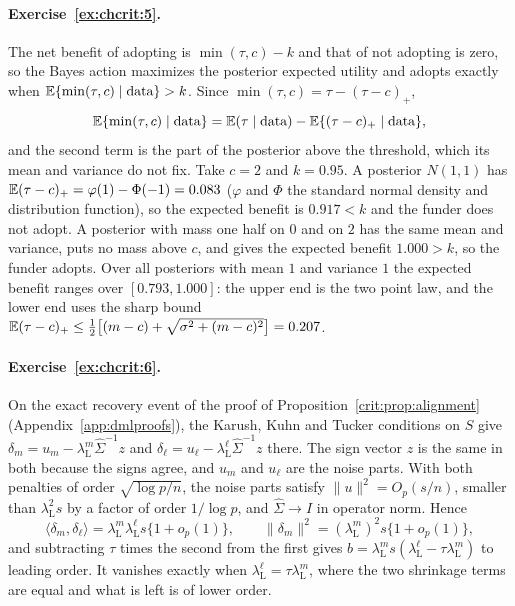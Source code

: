 \paragraph{Exercise~\ref{ex:chcrit:5}.} The net benefit of adopting is $\min(\tau, c) - k$ and that of not adopting is zero, so the Bayes action maximizes the posterior expected utility and adopts exactly when $\mathbb{E}\{\min(\tau, c) \mid \text{data}\} > k$. Since $\min(\tau, c) = \tau - (\tau - c)_+$,
\[
\mathbb{E}\{\min(\tau, c) \mid \text{data}\} = \mathbb{E}(\tau \mid \text{data}) - \mathbb{E}\{(\tau - c)_+ \mid \text{data}\},
\]
and the second term is the part of the posterior above the threshold, which its mean and variance do not fix. Take $c = 2$ and $k = 0.95$. A posterior $N(1, 1)$ has $\mathbb{E}(\tau - c)_+ = \varphi(1) - \Phi(-1) = 0.083$ ($\varphi$ and $\Phi$ the standard normal density and distribution function), so the expected benefit is $0.917 < k$ and the funder does not adopt. A posterior with mass one half on $0$ and on $2$ has the same mean and variance, puts no mass above $c$, and gives the expected benefit $1.000 > k$, so the funder adopts. Over all posteriors with mean $1$ and variance $1$ the expected benefit ranges over $[0.793, 1.000]$: the upper end is the two point law, and the lower end uses the sharp bound $\mathbb{E}(\tau - c)_+ \le \tfrac12\bigl[(m - c) + \sqrt{\sigma^2 + (m - c)^2}\bigr] = 0.207$.

\paragraph{Exercise~\ref{ex:chcrit:6}.} On the exact recovery event of the proof of Proposition~\ref{crit:prop:alignment} (Appendix~\ref{app:dmlproofs}), the Karush, Kuhn and Tucker conditions on $S$ give $\delta_m = u_m - \lambda_{\mathrm L}^m\hat\Sigma^{-1}z$ and $\delta_\ell = u_\ell - \lambda_{\mathrm L}^\ell\hat\Sigma^{-1}z$ there. The sign vector $z$ is the same in both because the signs agree, and $u_m$ and $u_\ell$ are the noise parts. With both penalties of order $\sqrt{\log p/n}$, the noise parts satisfy $\|u\|^2 = O_p(s/n)$, smaller than $\lambda_{\mathrm L}^2 s$ by a factor of order $1/\log p$, and $\hat\Sigma \to I$ in operator norm. Hence
\[
\langle\delta_m,\delta_\ell\rangle = \lambda_{\mathrm L}^m\lambda_{\mathrm L}^\ell s\{1 + o_p(1)\}, \qquad \|\delta_m\|^2 = (\lambda_{\mathrm L}^m)^2 s\{1 + o_p(1)\},
\]
and subtracting $\tau$ times the second from the first gives $b = \lambda_{\mathrm L}^m s(\lambda_{\mathrm L}^\ell - \tau\lambda_{\mathrm L}^m)$ to leading order. It vanishes exactly when $\lambda_{\mathrm L}^\ell = \tau\lambda_{\mathrm L}^m$, where the two shrinkage terms are equal and what is left is of lower order.

